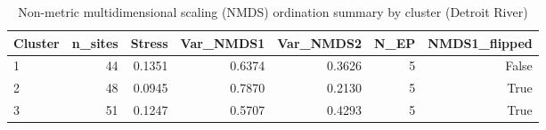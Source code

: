 \begin{table}[htbp]
  \centering
  \caption{Non-metric multidimensional scaling (NMDS) ordination summary by cluster (Detroit River)}
  \label{tab:dr_04_bray_curtis_NMDS_nmds_summary}
  \small
  \begin{tabular}{lrrrrrr}
    \toprule
    Cluster & n\_sites & Stress & Var\_NMDS1 & Var\_NMDS2 & N\_EP & NMDS1\_flipped \\
    \midrule
    1 & 44 & 0.1351 & 0.6374 & 0.3626 & 5 & False \\
    2 & 48 & 0.0945 & 0.7870 & 0.2130 & 5 & True \\
    3 & 51 & 0.1247 & 0.5707 & 0.4293 & 5 & True \\
    \bottomrule
  \end{tabular}
\end{table}
